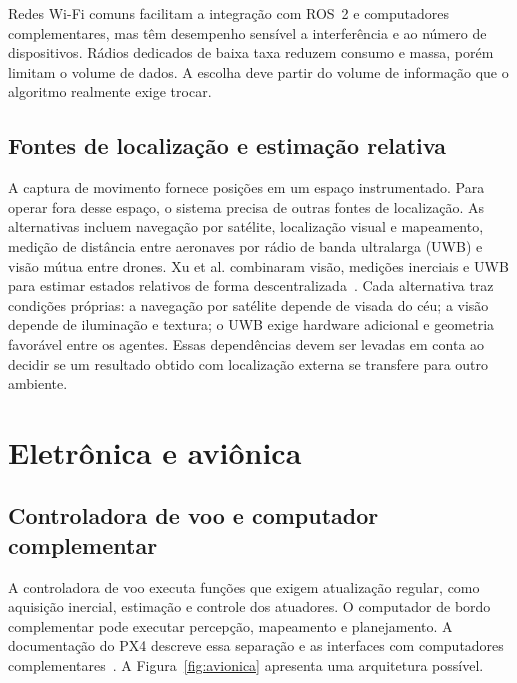 \documentclass[11pt,a4paper,oneside]{book}
\numberwithin{equation}{chapter}
\begin{document}
Redes Wi-Fi comuns facilitam a integração com ROS~2 e computadores complementares, mas têm desempenho sensível a interferência e ao número de dispositivos. Rádios dedicados de baixa taxa reduzem consumo e massa, porém limitam o volume de dados. A escolha deve partir do volume de informação que o algoritmo realmente exige trocar.

\section{Fontes de localização e estimação relativa}
A captura de movimento fornece posições em um espaço instrumentado. Para operar fora desse espaço, o sistema precisa de outras fontes de localização. As alternativas incluem navegação por satélite, localização visual e mapeamento, medição de distância entre aeronaves por rádio de banda ultralarga (UWB) e visão mútua entre drones. Xu et al. combinaram visão, medições inerciais e UWB para estimar estados relativos de forma descentralizada~\cite{uwbvio}. Cada alternativa traz condições próprias: a navegação por satélite depende de visada do céu; a visão depende de iluminação e textura; o UWB exige hardware adicional e geometria favorável entre os agentes. Essas dependências devem ser levadas em conta ao decidir se um resultado obtido com localização externa se transfere para outro ambiente.

\chapter{Eletrônica e aviônica}\label{cap:eletr}
\section{Controladora de voo e computador complementar}
A controladora de voo executa funções que exigem atualização regular, como aquisição inercial, estimação e controle dos atuadores. O computador de bordo complementar pode executar percepção, mapeamento e planejamento. A documentação do PX4 descreve essa separação e as interfaces com computadores complementares~\cite{companion}. A Figura~\ref{fig:avionica} apresenta uma arquitetura possível.
\end{document}

